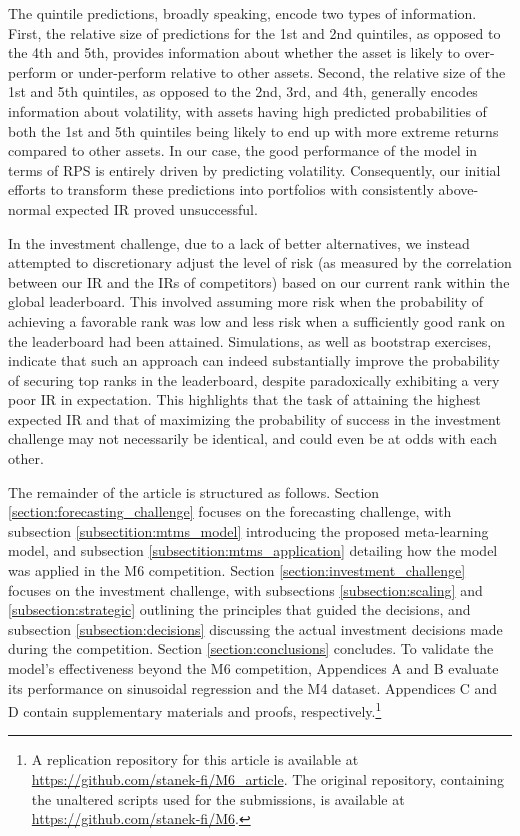\documentclass[3p,times,twocolumn]{elsarticle}
\begin{document}
The quintile predictions, broadly speaking, encode two types of information. 
First, the relative size of predictions for the 1st and 2nd quintiles, as opposed to the 4th and 5th, provides information about whether the asset is likely to over-perform or under-perform relative to other assets.
Second, the relative size of the 1st and 5th quintiles, as opposed to the 2nd, 3rd, and 4th, generally encodes information about volatility, with assets having high predicted probabilities of both the 1st and 5th quintiles being likely to end up with more extreme returns compared to other assets.
In our case, the good performance of the model in terms of RPS is entirely driven by predicting volatility.
Consequently, our initial efforts to transform these predictions into portfolios with consistently above-normal expected IR proved unsuccessful.

In the investment challenge, due to a lack of better alternatives, we instead attempted to discretionary adjust the level of risk (as measured by the correlation between our IR and the IRs of competitors) based on our current rank within the global leaderboard.
This involved assuming more risk when the probability of achieving a favorable rank was low and less risk when a sufficiently good rank on the leaderboard had been attained.
Simulations, as well as bootstrap exercises, indicate that such an approach can indeed substantially improve the probability of securing top ranks in the leaderboard, despite paradoxically exhibiting a very poor IR in expectation.
This highlights that the task of attaining the highest expected IR and that of maximizing the probability of success in the investment challenge may not necessarily be identical, and could even be at odds with each other.

The remainder of the article is structured as follows.
Section \ref{section:forecasting_challenge} focuses on the forecasting challenge, with subsection \ref{subsectition:mtms_model} introducing the proposed meta-learning model, and subsection \ref{subsectition:mtms_application} detailing how the model was applied in the M6 competition.
Section \ref{section:investment_challenge} focuses on the investment challenge, with subsections \ref{subsection:scaling} and \ref{subsection:strategic} outlining the principles that guided the decisions, and subsection \ref{subsection:decisions} discussing the actual investment decisions made during the competition.
Section \ref{section:conclusions} concludes. 
To validate the model's effectiveness beyond the M6 competition, Appendices A and B evaluate its performance on sinusoidal regression and the M4 dataset. %
Appendices C and D contain supplementary materials and proofs, respectively.\footnote{ %
    A replication repository for this article is available at \url{https://github.com/stanek-fi/M6_article}. 
    The original repository, containing the unaltered scripts used for the submissions, is available at \url{https://github.com/stanek-fi/M6}.
}
\end{document}
